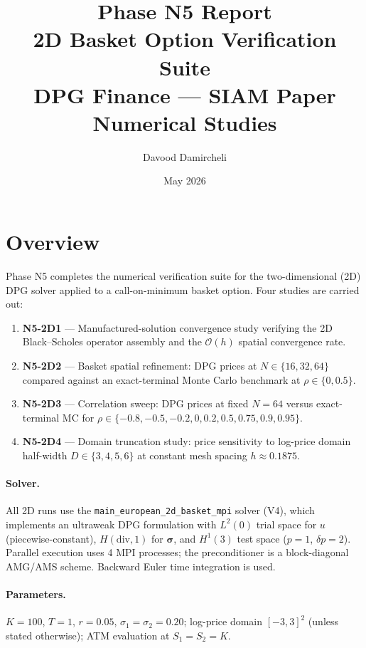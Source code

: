 \documentclass[11pt,a4paper]{article}
\title{\textbf{Phase N5 Report}\\
2D Basket Option Verification Suite\\
\large DPG Finance --- SIAM Paper Numerical Studies}
\author{Davood Damircheli}
\date{May 2026}
\begin{document}
\maketitle
\tableofcontents
\newpage

\section{Overview}

Phase N5 completes the numerical verification suite for the two-dimensional
(2D) DPG solver applied to a call-on-minimum basket option.  Four studies are
carried out:

\begin{enumerate}
  \item \textbf{N5-2D1} --- Manufactured-solution convergence study verifying
        the 2D Black--Scholes operator assembly and the $\mathcal{O}(h)$
        spatial convergence rate.
  \item \textbf{N5-2D2} --- Basket spatial refinement: DPG prices at
        $N\in\{16,32,64\}$ compared against an exact-terminal Monte Carlo
        benchmark at $\rho\in\{0,0.5\}$.
  \item \textbf{N5-2D3} --- Correlation sweep: DPG prices at fixed $N=64$
        versus exact-terminal MC for $\rho\in\{-0.8,-0.5,-0.2,0,0.2,0.5,
        0.75,0.9,0.95\}$.
  \item \textbf{N5-2D4} --- Domain truncation study: price sensitivity to
        log-price domain half-width $D\in\{3,4,5,6\}$ at constant mesh
        spacing $h\approx 0.1875$.
\end{enumerate}

\paragraph{Solver.}
All 2D runs use the \texttt{main\_european\_2d\_basket\_mpi} solver (V4),
which implements an ultraweak DPG formulation with $L^2(0)$ trial space for
$u$ (piecewise-constant), $H(\mathrm{div},1)$ for $\boldsymbol{\sigma}$, and
$H^1(3)$ test space ($p=1$, $\delta p=2$).  Parallel execution uses 4 MPI
processes; the preconditioner is a block-diagonal AMG/AMS scheme.  Backward
Euler time integration is used.

\paragraph{Parameters.}
$K=100$, $T=1$, $r=0.05$, $\sigma_1=\sigma_2=0.20$; log-price domain
$[{-3},{3}]^2$ (unless stated otherwise); ATM evaluation at $S_1=S_2=K$.
\end{document}
